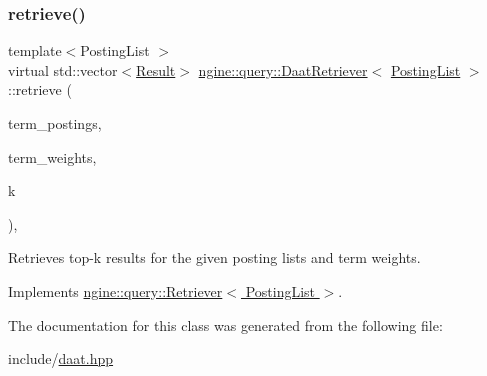 \subsubsection{\texorpdfstring{retrieve()}{retrieve()}}
{\footnotesize\ttfamily template$<$Posting\+List $>$ \\
virtual std\+::vector$<$\hyperlink{structngine_1_1query_1_1Result}{Result}$>$ \hyperlink{classngine_1_1query_1_1DaatRetriever}{ngine\+::query\+::\+Daat\+Retriever}$<$ \hyperlink{classngine_1_1PostingList}{Posting\+List} $>$\+::retrieve (\begin{DoxyParamCaption}\item[{const std\+::vector$<$ \hyperlink{classngine_1_1PostingList}{Posting\+List} $>$ \&}]{term\+\_\+postings,  }\item[{const std\+::vector$<$ \hyperlink{structngine_1_1Score}{Score} $>$ \&}]{term\+\_\+weights,  }\item[{std\+::size\+\_\+t}]{k }\end{DoxyParamCaption})\hspace{0.3cm}{\ttfamily [inline]}, {\ttfamily [virtual]}}



Retrieves top-\/k results for the given posting lists and term weights. 



Implements \hyperlink{classngine_1_1query_1_1Retriever_ac5549667cbb5927ec4ead8b9ec8aece0}{ngine\+::query\+::\+Retriever$<$ Posting\+List $>$}.



The documentation for this class was generated from the following file\+:\begin{DoxyCompactItemize}
\item 
include/\hyperlink{daat_8hpp}{daat.\+hpp}\end{DoxyCompactItemize}
